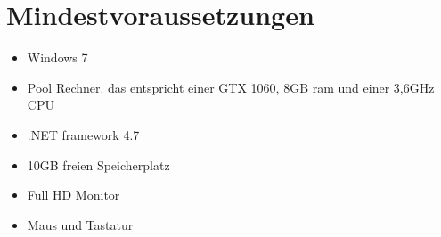 \section{Mindestvoraussetzungen}

%
%


\begin{itemize}[leftmargin=*, nosep]
    \item Windows 7
    \item Pool Rechner. das entspricht einer GTX 1060, 8GB ram und einer 3,6GHz CPU 
    \item .NET framework 4.7
    \item 10GB freien Speicherplatz
    \item Full HD Monitor
    \item Maus und Tastatur
\end{itemize}
